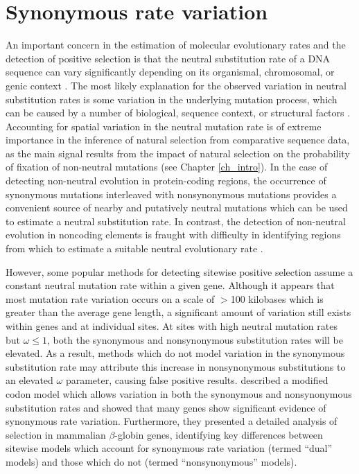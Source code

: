\section{Synonymous rate variation}


An important concern in the estimation of molecular evolutionary rates
and the detection of positive selection is that the neutral
substitution rate of a DNA sequence can vary significantly depending
on its organismal, chromosomal, or genic context
\citep{Wolfe1987,Gaut1996,Hurst2001,Tuplin2002,Mugal2010}. The most
likely explanation for the observed variation in neutral substitution
rates is some variation in the underlying mutation process, which can
be caused by a number of biological, sequence context, or structural
factors \citep{Ellegren2003,Gaffney2005,Mugal2010}. Accounting for
spatial variation in the neutral mutation rate is of extreme
importance in the inference of natural selection from comparative
sequence data, as the main signal results from the impact of natural
selection on the probability of fixation of non-neutral mutations (see
Chapter \ref{ch_intro}). In the case of detecting non-neutral
evolution in protein-coding regions, the occurrence of synonymous
mutations interleaved with nonsynonymous mutations provides a
convenient source of nearby and putatively neutral mutations which can
be used to estimate a neutral substitution rate. In contrast, the
detection of non-neutral evolution in noncoding elements is fraught
with difficulty in identifying regions from which to estimate a
suitable neutral evolutionary rate \citep{Taylor2008}.

However, some popular methods for detecting sitewise positive
selection assume a constant neutral mutation rate within a given
gene. Although it appears that most mutation rate variation occurs on
a scale of $>$100 kilobases \citep{Gaffney2005} which is greater than
the average gene length, a significant amount of variation still
exists within genes and at individual sites. At sites with high
neutral mutation rates but $\omega\leq1$, both the synonymous and
nonsynonymous substitution rates will be elevated. As a result,
methods which do not model variation in the synonymous substitution
rate may attribute this increase in nonsynonymous substitutions to an
elevated $\omega$ parameter, causing false positive
results. \citet{Pond2005b} described a modified codon model which
allows variation in both the synonymous and nonsynonymous substitution
rates and showed that many genes show significant evidence of
synonymous rate variation. Furthermore, they presented a detailed
analysis of selection in mammalian $\beta$-globin genes, identifying
key differences between sitewise models which account for synonymous
rate variation (termed ``dual'' models) and those which do not (termed
``nonsynonymous'' models).

